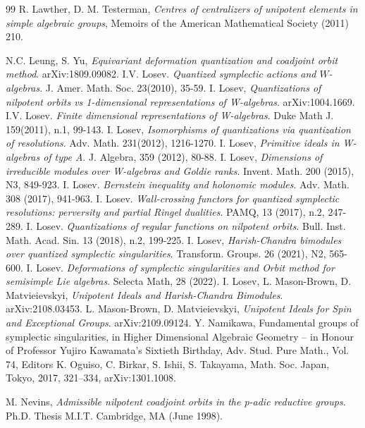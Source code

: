 \documentclass[12pt]{amsart}
\theoremstyle{definition}
\numberwithin{equation}{section}
\begin{document}
\begin{thebibliography}{99}
R. Lawther, D. M. Testerman,
{\it Centres of centralizers of unipotent elements in simple algebraic groups},
 Memoirs of the American Mathematical Society (2011) 210.

 N.C. Leung, S. Yu,
{\it Equivariant deformation quantization and coadjoint orbit method}.
arXiv:1809.09082.
 I.V. Losev. {\it Quantized symplectic actions and
$W$-algebras}.   J. Amer. Math. Soc. 23(2010), 35-59.
 I. Losev, {\it Quantizations of nilpotent orbits vs 1-dimensional representations of W-algebras}. arXiv:1004.1669.
 I.V. Losev. {\it Finite dimensional representations of
W-algebras}. Duke Math J. 159(2011), n.1, 99-143.
 I. Losev, {\it Isomorphisms of quantizations via quantization of resolutions}. Adv. Math. 231(2012), 1216-1270.
 I. Losev, {\it Primitive ideals in W-algebras of type A}. J. Algebra, 359 (2012), 80-88.
 I. Losev, {\it Dimensions of irreducible modules over W-algebras and Goldie ranks}.
Invent. Math. 200 (2015), N3, 849-923.
 I. Losev. {\it Bernstein inequality and holonomic modules}. Adv. Math. 308 (2017),  941-963.
  I. Losev. {\it Wall-crossing functors for quantized symplectic resolutions:
perversity and partial Ringel dualities}.  PAMQ, 13 (2017),
n.2, 247-289.
 I. Losev. {\it Quantizations of regular functions on nilpotent orbits}.  Bull. Inst. Math. Acad. Sin. 13 (2018), n.2, 199-225.
 I. Losev, {\it Harish-Chandra bimodules over quantized symplectic singularities}.
Transform. Groups. 26 (2021), N2, 565-600.
 I. Losev. {\it Deformations of symplectic singularities and Orbit method for semisimple Lie algebras}. Selecta Math, 28 (2022).
 I. Losev, L. Mason-Brown, D. Matvieievskyi, {\it Unipotent Ideals and Harish-Chandra Bimodules}. arXiv:2108.03453.
 L. Mason-Brown, D. Matvieievskyi, {\it Unipotent Ideals for Spin and Exceptional Groups}.
arXiv:2109.09124.
 Y. Namikawa, Fundamental groups of symplectic singularities, in Higher Dimensional Algebraic Geometry –
in Honour of Professor Yujiro Kawamata’s Sixtieth Birthday, Adv. Stud. Pure Math., Vol. 74, Editors
K. Oguiso, C. Birkar, S. Ishii, S. Takayama, Math. Soc. Japan, Tokyo, 2017, 321–334, arXiv:1301.1008.

 M. Nevins, {\it Admissible nilpotent coadjoint orbits in the p-adic reductive groups}. Ph.D. Thesis M.I.T. Cambridge, MA (June 1998).


\end{thebibliography}
\end{document}
